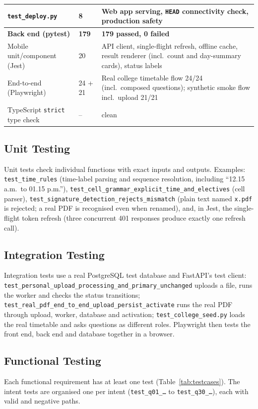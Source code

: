 \begin{table}[H]
\begin{tabularx}{\textwidth}{@{}p{4.5cm}p{1.8cm}X@{}}
\texttt{test\_\allowbreak{}deploy.py} & 8 & Web app serving, \texttt{HEAD} connectivity check, production safety\\
\midrule
\textbf{Back end (pytest)} & \textbf{179} & \textbf{179 passed, 0 failed}\\
Mobile unit/component (Jest) & 20 & API client, single-flight refresh, offline cache, result renderer (incl.\ count and day-summary cards), status labels\\
End-to-end (Playwright) & 24 + 21 & Real college timetable flow 24/24 (incl.\ composed questions); synthetic smoke flow incl.\ upload 21/21\\
TypeScript \texttt{strict} type check & -- & clean\\
\bottomrule
\end{tabularx}
\end{table}

\subsection{Unit Testing}
Unit tests check individual functions with exact inputs and outputs. Examples:
\texttt{test\_\allowbreak{}time\_\allowbreak{}rules} (time-label parsing and sequence resolution, including ``12.15 a.m.\ to
01.15 p.m.''), \texttt{test\_cell\_grammar\_explicit\_time\_and\_electives} (cell parser),
\texttt{test\_\allowbreak{}signature\_\allowbreak{}detection\_\allowbreak{}rejects\_\allowbreak{}mismatch} (plain text named \texttt{x.pdf} is rejected; a real PDF is recognised even when renamed),
and, in Jest, the single-flight token refresh (three concurrent 401 responses produce exactly one
refresh call).

\subsection{Integration Testing}
Integration tests use a real PostgreSQL test database and FastAPI's test client:
\texttt{test\_\allowbreak{}personal\_\allowbreak{}upload\_\allowbreak{}processing\_\allowbreak{}and\_\allowbreak{}primary\_\allowbreak{}unchanged} uploads a file, runs the worker and
checks the status transitions; \texttt{test\_real\_pdf\_end\_to\_end\_upload\_persist\_activate} runs the
real PDF through upload, worker, database and activation; \texttt{test\_college\_seed.py} loads the real
timetable and asks questions as different roles. Playwright then tests the front end, back end and
database together in a browser.

\subsection{Functional Testing}
Each functional requirement has at least one test (Table~\ref{tab:testcases}). The intent tests are
organised one per intent (\texttt{test\_q01\_\ldots} to \texttt{test\_q30\_\ldots}), each with valid and
negative paths.

